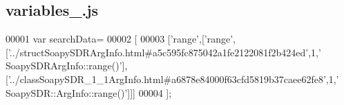 \subsection{variables\+\_.\+js}
\label{variables__5_8js_source}

\begin{DoxyCode}
00001 var searchData=
00002 [
00003   [\textcolor{stringliteral}{'range'},[\textcolor{stringliteral}{'range'},[\textcolor{stringliteral}{'../structSoapySDRArgInfo.html#a5c595fc875042a1fe2122081f2b424ed'},1,\textcolor{stringliteral}{'
      SoapySDRArgInfo::range()'}],[\textcolor{stringliteral}{'../classSoapySDR\_1\_1ArgInfo.html#a6878e84000f63cfd5819b37caee62fe8'},1,\textcolor{stringliteral}{'
      SoapySDR::ArgInfo::range()'}]]]
00004 ];
\end{DoxyCode}
